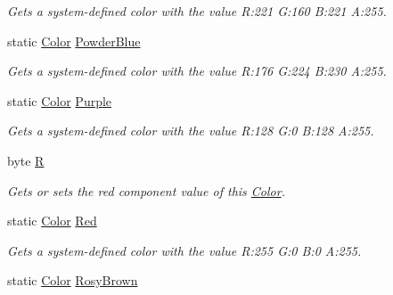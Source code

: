 \begin{DoxyCompactItemize}
\begin{DoxyCompactList}\small\item\em Gets a system-\/defined color with the value R\+:221 G\+:160 B\+:221 A\+:255.\end{DoxyCompactList}\item 
static \hyperlink{structMicrosoft_1_1Xna_1_1Framework_1_1Color}{Color} \hyperlink{structMicrosoft_1_1Xna_1_1Framework_1_1Color_a9291f40f2de88d671a1d2d24804376e4}{Powder\+Blue}
\begin{DoxyCompactList}\small\item\em Gets a system-\/defined color with the value R\+:176 G\+:224 B\+:230 A\+:255.\end{DoxyCompactList}\item 
static \hyperlink{structMicrosoft_1_1Xna_1_1Framework_1_1Color}{Color} \hyperlink{structMicrosoft_1_1Xna_1_1Framework_1_1Color_a5b1970e101009b75c1a49383f01c9672}{Purple}
\begin{DoxyCompactList}\small\item\em Gets a system-\/defined color with the value R\+:128 G\+:0 B\+:128 A\+:255.\end{DoxyCompactList}\item 
byte \hyperlink{structMicrosoft_1_1Xna_1_1Framework_1_1Color_a9899281d9638e30c6a5ed7ec4e6af4f4}{R}
\begin{DoxyCompactList}\small\item\em Gets or sets the red component value of this \hyperlink{structMicrosoft_1_1Xna_1_1Framework_1_1Color}{Color}.\end{DoxyCompactList}\item 
static \hyperlink{structMicrosoft_1_1Xna_1_1Framework_1_1Color}{Color} \hyperlink{structMicrosoft_1_1Xna_1_1Framework_1_1Color_a87a605a75f99f27ebe26ae418abc548f}{Red}
\begin{DoxyCompactList}\small\item\em Gets a system-\/defined color with the value R\+:255 G\+:0 B\+:0 A\+:255.\end{DoxyCompactList}\item 
static \hyperlink{structMicrosoft_1_1Xna_1_1Framework_1_1Color}{Color} \hyperlink{structMicrosoft_1_1Xna_1_1Framework_1_1Color_af611d84fcfced58f4507f5fca5e63dd5}{Rosy\+Brown}

\end{DoxyCompactItemize}
